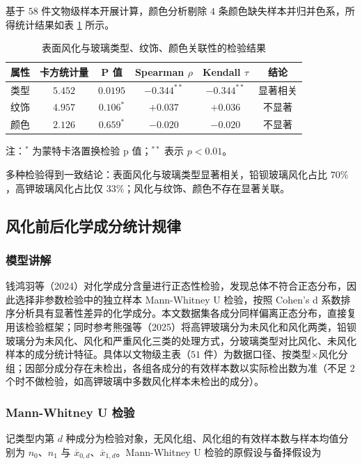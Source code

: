 \documentclass{ctexart}
\begin{document}
基于 $58$ 件文物级样本开展计算，颜色分析剔除 $4$ 条颜色缺失样本并归并色系，所得统计结果如表 \ref{tab:assoc} 所示。

\begin{table}[htbp]
\centering
\caption{表面风化与玻璃类型、纹饰、颜色关联性的检验结果}
\label{tab:assoc}
\begin{tabular}{c|c|c|c|c|c}
\hline
属性 & 卡方统计量 & P 值 & Spearman $\rho$ & Kendall $\tau$ & 结论 \\
\hline
类型 & $5.452$ & $0.0195$ & $-0.344^{**}$ & $-0.344^{**}$ & 显著相关 \\
纹饰 & $4.957$ & $0.106^*$ & $+0.037$ & $+0.036$ & 不显著 \\
颜色 & $2.126$ & $0.659^*$ & $-0.020$ & $-0.020$ & 不显著 \\
\hline
\end{tabular}
\end{table}

注：$^*$ 为蒙特卡洛置换检验 p 值；$^{**}$ 表示 $p<0.01$。

多种检验得到一致结论：表面风化与玻璃类型显著相关，铅钡玻璃风化占比 $70\%$，高钾玻璃风化占比仅 $33\%$；风化与纹饰、颜色不存在显著关联。

\subsection{风化前后化学成分统计规律}

\subsubsection{模型讲解}

钱鸿羽等（2024）对化学成分含量进行正态性检验，发现总体不符合正态分布，因此选择非参数检验中的独立样本 Mann-Whitney U 检验，按照 Cohen's d 系数排序分析具有显著性差异的化学成分。本文数据集各成分同样偏离正态分布，直接复用该检验框架；同时参考熊强等（2025）将高钾玻璃分为未风化和风化两类，铅钡玻璃分为未风化、风化和严重风化三类的处理方式，分玻璃类型对比风化、未风化样本的成分统计特征。具体以文物级主表（$51$ 件）为数据口径、按类型$\times$风化分组；因部分成分存在未检出，各组各成分的有效样本数以实际检出数为准（不足 $2$ 个时不做检验，如高钾玻璃中多数风化样本未检出的成分）。


\subsubsection{Mann-Whitney U 检验}

记类型内第 $d$ 种成分为检验对象，无风化组、风化组的有效样本数与样本均值分别为 $n_{0}$、$n_{1}$ 与 $\overline{x}_{0,d}$、$\overline{x}_{1,d}$。Mann-Whitney U 检验的原假设与备择假设为
\end{document}
